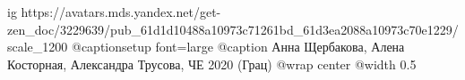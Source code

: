  
 
 
 
 

\ifcmt
  ig https://avatars.mds.yandex.net/get-zen_doc/3229639/pub_61d1d10488a10973c71261bd_61d3ea2088a10973c70e1229/scale_1200
	@captionsetup font=large
  @caption Анна Щербакова, Алена Косторная, Александра Трусова, ЧЕ 2020 (Грац)
	@wrap center
	@width 0.5
\fi
